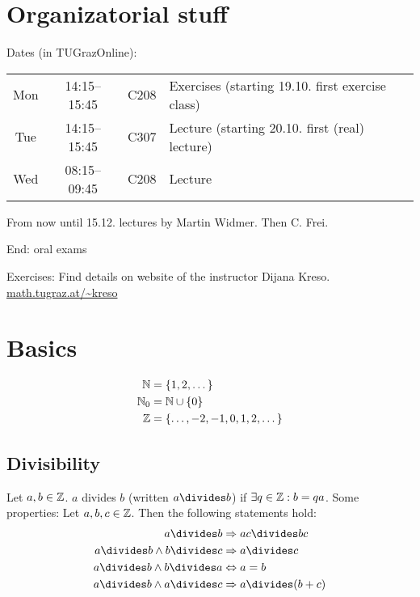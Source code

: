 \documentclass[NumTh.tex]{subfiles}
\begin{document}
\section*{Organizatorial stuff}

Dates (in TUGrazOnline):
\begin{table}[!h]
  \begin{tabular}{cccl}
    Mon & 14:15--15:45 & C208 & Exercises (starting 19.10. first exercise class) \\
    Tue & 14:15--15:45 & C307 & Lecture (starting 20.10. first (real) lecture) \\
    Wed & 08:15--09:45 & C208 & Lecture
  \end{tabular}
\end{table}

From now until 15.12. lectures by Martin Widmer.
Then C. Frei.

End: oral exams

Exercises: Find details on website of the instructor Dijana Kreso.
\url{math.tugraz.at/~kreso}

\section{Basics}

\begin{align}
  \mathbb{N} &= \{1,2,\dots\} \\
  \mathbb{N}_0 &= \mathbb{N} \cup \{0\}\\
  \mathbb{Z} &= \{ \dots,-2,-1,0,1,2,\dots\}
\end{align}

\subsection{Divisibility}
\begin{defi}
Let $a,b \in \mathbb{Z}$. $a$ divides $b$ (written $a\divides b$) if $\exists q \in \mathbb{Z} : b = qa$.
\newline
Some properties: Let $a,b,c \in \mathbb{Z}$. Then the following statements hold:
\begin{align}
  a\divides b &\Rightarrow ac\divides bc \\
  a\divides b \land b\divides c &\Rightarrow a\divides c \\
  a\divides b \land b\divides a &\Leftrightarrow a = b \\
  a\divides b \land a\divides c &\Rightarrow a\divides (b+c)
\end{align}
\end{defi}
\end{document}
